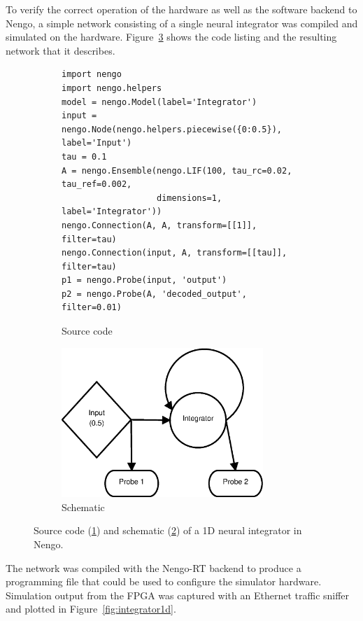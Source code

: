 \documentclass[english]{article}
\newcommand{\design}{Nengo-RT}
\begin{document}
To verify the correct operation of the hardware as well as the software backend to Nengo, a simple network consisting of a single neural integrator was compiled and simulated on the hardware.
Figure~\ref{lst:integrator1d} shows the code listing and the resulting network that it describes.
\begin{figure}
\centering

\begin{subfigure}[b]{\textwidth}
\centering
\lstset{language=Python}
\begin{lstlisting}[frame=single]
import nengo
import nengo.helpers
model = nengo.Model(label='Integrator')
input = nengo.Node(nengo.helpers.piecewise({0:0.5}), label='Input')
tau = 0.1
A = nengo.Ensemble(nengo.LIF(100, tau_rc=0.02, tau_ref=0.002,
                   dimensions=1, label='Integrator'))
nengo.Connection(A, A, transform=[[1]], filter=tau)
nengo.Connection(input, A, transform=[[tau]], filter=tau)
p1 = nengo.Probe(input, 'output')
p2 = nengo.Probe(A, 'decoded_output', filter=0.01)
\end{lstlisting}
\caption{Source code}
\label{lst:integrator1d:code}
\end{subfigure}

\begin{subfigure}[b]{0.3\textwidth}
\centering
\includegraphics[width=3.0in]{integrator-1d-schematic.eps}
\caption{Schematic}
\label{lst:integrator1d:schematic}
\end{subfigure}

\caption[A 1D neural integrator in Nengo.]
{Source code (\ref{lst:integrator1d:code}) and schematic (\ref{lst:integrator1d:schematic}) of a 1D neural integrator in Nengo.}
\label{lst:integrator1d}
\end{figure}

The network was compiled with the \design{} backend to produce a programming file that could be used to configure the simulator hardware.
Simulation output from the FPGA was captured with an Ethernet traffic sniffer and plotted in Figure~\ref{fig:integrator1d}.
\end{document}
